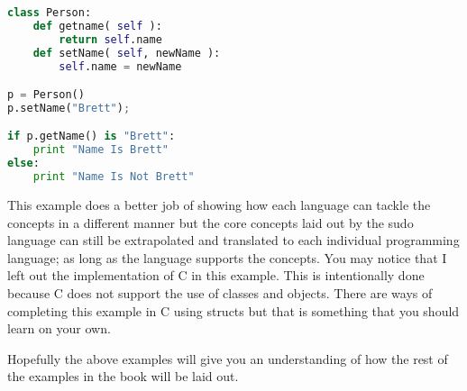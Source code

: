 \begin{lstlisting}[language=python,caption={Example 2 - Python}]
class Person:
    def getname( self ):
        return self.name
    def setName( self, newName ):
        self.name = newName

p = Person()
p.setName("Brett");

if p.getName() is "Brett":
    print "Name Is Brett"
else:
    print "Name Is Not Brett"
\end{lstlisting}

This example does a better job of showing how each language can tackle the concepts in a different manner but the core concepts
laid out by the sudo language can still be extrapolated and translated to each individual programming language; as long as the language supports the concepts.
You may notice that I left out the implementation of C in this example.
This is intentionally done because C does not support the use of classes and objects.  There are ways of completing this example in C using structs but that
is something that you should learn on your own.
\par

Hopefully the above examples will give you an understanding of how the rest of the examples in the book will be laid out.
